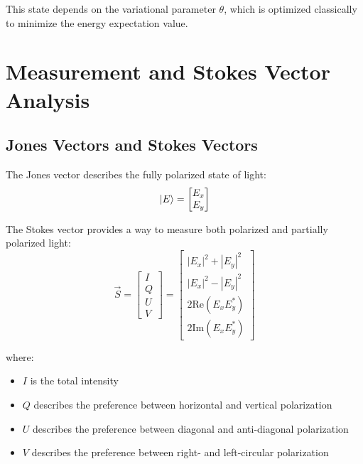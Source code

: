 \documentclass[
	a4paper,
	12pt,
	oneside,
]{article}
\begin{document}
This state depends on the variational parameter $\theta$, which is optimized classically to minimize the energy expectation value.


\section{Measurement and Stokes Vector Analysis}

\subsection{Jones Vectors and Stokes Vectors}

The Jones vector describes the fully polarized state of light:
\[
\ket{E} = \begin{bmatrix} E_x \\ E_y \end{bmatrix}
\]

The Stokes vector provides a way to measure both polarized and partially polarized light:
\begin{equation}
\vec{S} = \begin{bmatrix}
	I \\
	Q \\
	U \\
	V
\end{bmatrix} = \begin{bmatrix}
	|E_x|^2 + |E_y|^2 \\
	|E_x|^2 - |E_y|^2 \\
	2\text{Re}(E_x E_y^*) \\
	2\text{Im}(E_x E_y^*)
\end{bmatrix}
\label{eq:stokes}
\end{equation}

where:
\begin{itemize}
	\item $I$ is the total intensity
	\item $Q$ describes the preference between horizontal and vertical polarization
	\item $U$ describes the preference between diagonal and anti-diagonal polarization
	\item $V$ describes the preference between right- and left-circular polarization
\end{itemize}
\end{document}
